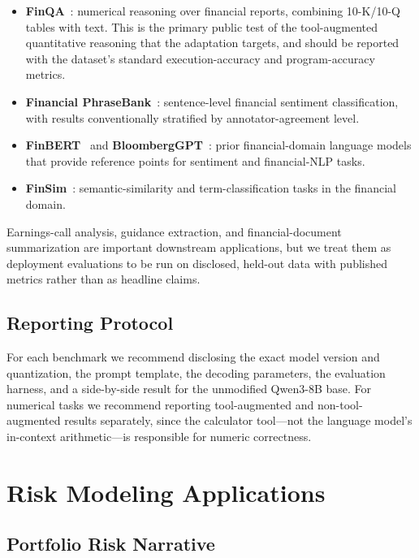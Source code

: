 \documentclass[11pt,a4paper]{article}
\begin{document}
\begin{itemize}
  \item \textbf{FinQA}~\cite{finqa}: numerical reasoning over financial reports, combining 10-K/10-Q tables with text. This is the primary public test of the tool-augmented quantitative reasoning that the adaptation targets, and should be reported with the dataset's standard execution-accuracy and program-accuracy metrics.
  \item \textbf{Financial PhraseBank}~\cite{phrasebank}: sentence-level financial sentiment classification, with results conventionally stratified by annotator-agreement level.
  \item \textbf{FinBERT}~\cite{finbert} and \textbf{BloombergGPT}~\cite{bloomberg}: prior financial-domain language models that provide reference points for sentiment and financial-NLP tasks.
  \item \textbf{FinSim}~\cite{finsim}: semantic-similarity and term-classification tasks in the financial domain.
\end{itemize}

Earnings-call analysis, guidance extraction, and financial-document summarization are important downstream applications, but we treat them as deployment evaluations to be run on disclosed, held-out data with published metrics rather than as headline claims.

\subsection{Reporting Protocol}

For each benchmark we recommend disclosing the exact model version and quantization, the prompt template, the decoding parameters, the evaluation harness, and a side-by-side result for the unmodified Qwen3-8B base. For numerical tasks we recommend reporting tool-augmented and non-tool-augmented results separately, since the calculator tool---not the language model's in-context arithmetic---is responsible for numeric correctness.

\section{Risk Modeling Applications}

\subsection{Portfolio Risk Narrative}
\end{document}
